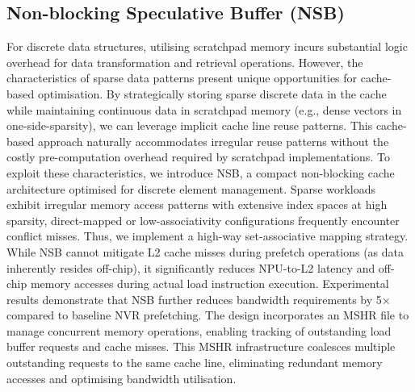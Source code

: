 




\vspace{-3pt}
\subsection{Non-blocking Speculative Buffer (NSB)}
\vspace{-2pt}
For discrete data structures, utilising scratchpad memory incurs substantial logic overhead for data transformation and retrieval operations. However, the characteristics of sparse data patterns present unique opportunities for cache-based optimisation. By strategically storing sparse discrete data in the cache while maintaining continuous data in scratchpad memory (e.g., dense vectors in one-side-sparsity), we can leverage implicit cache line reuse patterns. This cache-based approach naturally accommodates irregular reuse patterns without the costly pre-computation overhead required by scratchpad implementations.
To exploit these characteristics, we introduce NSB, a compact non-blocking cache architecture optimised for discrete element management. Sparse workloads exhibit irregular memory access patterns with extensive index spaces at high sparsity, direct-mapped or low-associativity configurations frequently encounter conflict misses. Thus, we implement a high-way set-associative mapping strategy.
While NSB cannot mitigate L2 cache misses during prefetch operations (as data inherently resides off-chip), it significantly reduces NPU-to-L2 latency and off-chip memory accesses during actual load instruction execution. Experimental results demonstrate that NSB further reduces bandwidth requirements by 5× compared to baseline NVR prefetching.
The design incorporates an MSHR file to manage concurrent memory operations, enabling tracking of outstanding load buffer requests and cache misses. This MSHR infrastructure coalesces multiple outstanding requests to the same cache line, eliminating redundant memory accesses and optimising bandwidth utilisation.


